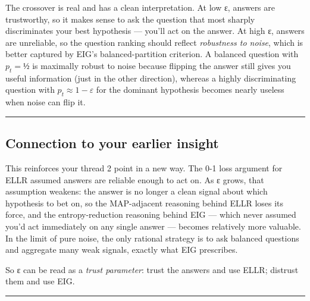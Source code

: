 \documentclass[
]{article}
\begin{document}
The crossover is real and has a clean interpretation. At low ε, answers
are trustworthy, so it makes sense to ask the question that most sharply
discriminates your best hypothesis --- you'll act on the answer. At high
ε, answers are unreliable, so the question ranking should reflect
\emph{robustness to noise}, which is better captured by EIG's
balanced-partition criterion. A balanced question with \(p_t = ½\) is
maximally robust to noise because flipping the answer still gives you
useful information (just in the other direction), whereas a highly
discriminating question with \(p_t \approx 1-\varepsilon\) for the
dominant hypothesis becomes nearly useless when noise can flip it.

\begin{center}\rule{0.5\linewidth}{0.5pt}\end{center}

\subsection{Connection to your earlier
insight}\label{connection-to-your-earlier-insight}

This reinforces your thread 2 point in a new way. The 0-1 loss argument
for ELLR assumed answers are reliable enough to act on. As ε grows, that
assumption weakens: the answer is no longer a clean signal about which
hypothesis to bet on, so the MAP-adjacent reasoning behind ELLR loses
its force, and the entropy-reduction reasoning behind EIG --- which
never assumed you'd act immediately on any single answer --- becomes
relatively more valuable. In the limit of pure noise, the only rational
strategy is to ask balanced questions and aggregate many weak signals,
exactly what EIG prescribes.

So ε can be read as a \emph{trust parameter}: trust the answers and use
ELLR; distrust them and use EIG.

\begin{center}\rule{0.5\linewidth}{0.5pt}\end{center}
\end{document}
